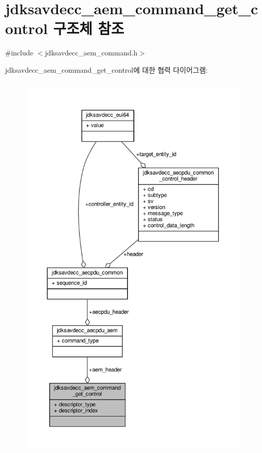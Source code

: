 \hypertarget{structjdksavdecc__aem__command__get__control}{}\section{jdksavdecc\+\_\+aem\+\_\+command\+\_\+get\+\_\+control 구조체 참조}
\label{structjdksavdecc__aem__command__get__control}


{\ttfamily \#include $<$jdksavdecc\+\_\+aem\+\_\+command.\+h$>$}



jdksavdecc\+\_\+aem\+\_\+command\+\_\+get\+\_\+control에 대한 협력 다이어그램\+:
\nopagebreak
\begin{figure}[H]
\begin{center}
\leavevmode
\includegraphics[height=550pt]{structjdksavdecc__aem__command__get__control__coll__graph}
\end{center}
\end{figure}
